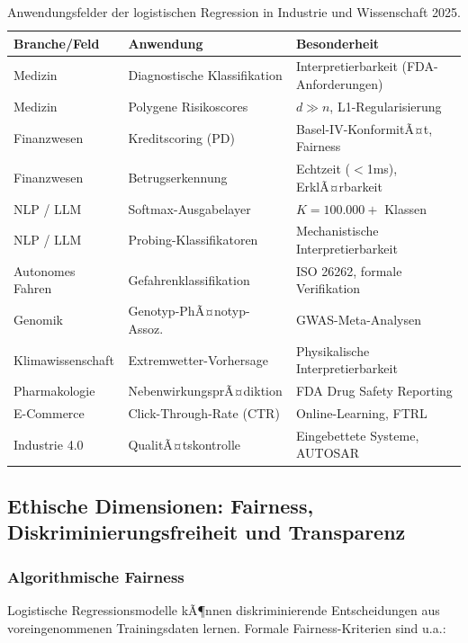﻿\documentclass[12pt, a4paper]{article}
\theoremstyle{definition}
\theoremstyle{remark}
\begin{document}
\begin{table}[H]
  \centering
  \caption{Anwendungsfelder der logistischen Regression in Industrie und Wissenschaft 2025.}
  \small
  \begin{tabular}{lll}
    \toprule
    Branche/Feld & Anwendung & Besonderheit \\
    \midrule
    Medizin & Diagnostische Klassifikation & Interpretierbarkeit (FDA-Anforderungen) \\
    Medizin & Polygene Risikoscores & $d \gg n$, L1-Regularisierung \\
    Finanzwesen & Kreditscoring (PD) & Basel-IV-KonformitÃ¤t, Fairness \\
    Finanzwesen & Betrugserkennung & Echtzeit ($<$1ms), ErklÃ¤rbarkeit \\
    NLP / LLM & Softmax-Ausgabelayer & $K = 100.000+$ Klassen \\
    NLP / LLM & Probing-Klassifikatoren & Mechanistische Interpretierbarkeit \\
    Autonomes Fahren & Gefahrenklassifikation & ISO 26262, formale Verifikation \\
    Genomik & Genotyp-PhÃ¤notyp-Assoz. & GWAS-Meta-Analysen \\
    Klimawissenschaft & Extremwetter-Vorhersage & Physikalische Interpretierbarkeit \\
    Pharmakologie & NebenwirkungsprÃ¤diktion & FDA Drug Safety Reporting \\
    E-Commerce & Click-Through-Rate (CTR) & Online-Learning, FTRL \\
    Industrie 4.0 & QualitÃ¤tskontrolle & Eingebettete Systeme, AUTOSAR \\
    \bottomrule
  \end{tabular}
  \label{tab:applications}
\end{table}

\subsection{Ethische Dimensionen: Fairness, Diskriminierungsfreiheit und Transparenz}

\subsubsection{Algorithmische Fairness}

Logistische Regressionsmodelle kÃ¶nnen diskriminierende Entscheidungen aus voreingenommenen
Trainingsdaten lernen. Formale Fairness-Kriterien sind u.a.:
\end{document}
